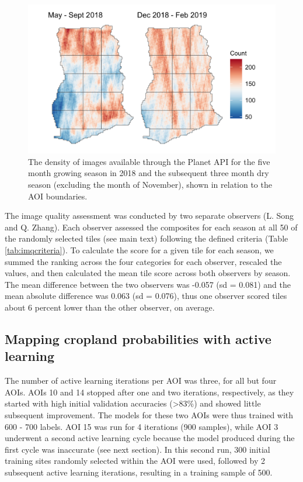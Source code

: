 \documentclass[
  11pt,
  a4paper]{article}
\begin{document}
\begin{figure}[!ht]

{\centering \includegraphics[width=0.9\linewidth,]{figures/si_planet_coverage} 

}

\caption{The density of images available through the Planet API for the five month growing season in 2018 and the subsequent three month dry season (excluding the month of November), shown in relation to the AOI boundaries.}\label{fig:imagedensity}
\end{figure}

The image quality assessment was conducted by two separate observers (L.
Song and Q. Zhang). Each observer assessed the composites for each
season at all 50 of the randomly selected tiles (see main text)
following the defined criteria (Table \ref{tab:imqcriteria}). To
calculate the score for a given tile for each season, we summed the
ranking across the four categories for each observer, rescaled the
values, and then calculated the mean tile score across both observers by
season. The mean difference between the two observers was -0.057 (sd =
0.081) and the mean absolute difference was 0.063 (sd = 0.076), thus one
observer scored tiles about 6 percent lower than the other observer, on
average.

\hypertarget{mapping-cropland-probabilities-with-active-learning}{%
\subsection{Mapping cropland probabilities with active
learning}\label{mapping-cropland-probabilities-with-active-learning}}

The number of active learning iterations per AOI was three, for all but
four AOIs. AOIs 10 and 14 stopped after one and two iterations,
respectively, as they started with high initial validation accuracies
(\textgreater83\%) and showed little subsequent improvement. The models
for these two AOIs were thus trained with 600 - 700 labels. AOI 15 was
run for 4 iterations (900 samples), while AOI 3 underwent a second
active learning cycle because the model produced during the first cycle
was inaccurate (see next section). In this second run, 300 initial
training sites randomly selected within the AOI were used, followed by 2
subsequent active learning iterations, resulting in a training sample of
500.
\end{document}

